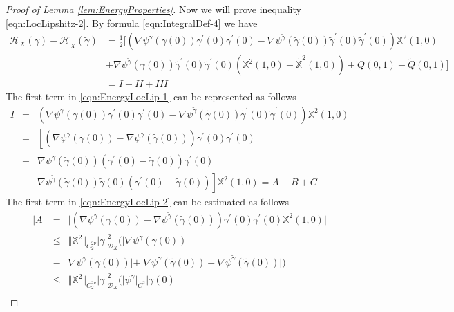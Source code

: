 \documentclass[11pt,a4paper,leqno]{amsart}%
\theoremstyle{plain}
\theoremstyle{remark}
\theoremstyle{plain}
\numberwithin{equation}{section}
\begin{document}
\begin{proof}[ Proof of Lemma \ref{lem:EnergyProperties}]
Now we will prove inequality \eqref{eqn:LocLipshitz-2}. By formula
\eqref{eqn:IntegralDef-4} we have
\begin{align}\label{eqn:EnergyLocLip-1}
\mathcal{H}_X(\gamma)-\mathcal{H}_{\tilde{X}}(\tilde{\gamma})&=\frac{1}{2}
\Big[(\nabla\psi^{\gamma}(\gamma(0))\gamma^\prime(0)\gamma^\prime(0)-\nabla\psi^{\tilde{\gamma}}(\tilde{\gamma}(0))\tilde{\gamma}^\prime(0)\tilde{\gamma}^\prime(0))
\mathbb{X}^2(1,0)\nonumber\\
&+\nabla\psi^{\tilde{\gamma}}(\tilde{\gamma}(0))\tilde{\gamma}^\prime(0)\tilde{\gamma}^\prime(0)(\mathbb{X}^2(1,0)-\mathbb{\tilde{X}}^2(1,0))
+Q(0,1)-\tilde{Q}(0,1)\Big]\!
\nonumber\\
 &=\!I\! +\! II\! +\! III
\end{align}
The first term in \eqref{eqn:EnergyLocLip-1} can be represented as
follows
\begin{eqnarray}
I &=&
(\nabla\psi^{\gamma}(\gamma(0))\gamma^\prime(0)\gamma^\prime(0)-\nabla\psi^{\tilde{\gamma}}(\tilde{\gamma}(0))\tilde{\gamma}^\prime(0)\tilde{\gamma}^\prime(0))
\mathbb{X}^2(1,0)\nonumber\\
 &=& \left[(\nabla\psi^{\gamma}(\gamma(0))-\nabla\psi^{\tilde{\gamma}}(\tilde{\gamma}(0)))\gamma^\prime(0)\gamma^\prime(0)\right.\nonumber\\
 &+& \nabla\psi^{\tilde{\gamma}}(\tilde{\gamma}(0))(\gamma^\prime(0)-\tilde{\gamma}(0))\gamma^\prime(0)\nonumber\\
 &+& \left.\nabla\psi^{\tilde{\gamma}}(\tilde{\gamma}(0))\tilde{\gamma}(0)(\gamma^\prime(0)-\tilde{\gamma}(0))\right]\mathbb{X}^2(1,0)=A+B+C\label{eqn:EnergyLocLip-2}
\end{eqnarray}
The first term in \eqref{eqn:EnergyLocLip-2} can be estimated as
follows
\begin{eqnarray}\label{eqn:EnergyLocLip-3}
\vert A\vert &=&\vert (\nabla\psi^{\gamma}(\gamma(0))-\nabla\psi^{\tilde{\gamma}}(\tilde{\gamma}(0)))\gamma^\prime(0)\gamma^\prime(0)\mathbb{X}^2(1,0)\vert \\
&\leq&
\Vert \mathbb{X}^2\Vert_{C_2^{2\nu}}\vert \gamma\vert_{\mathcal{D}_X}^2(\vert \nabla\psi^{\gamma}
(\gamma(0))\nonumber\\
&-&\nabla\psi^{\gamma}(\tilde{\gamma}(0))\vert +\vert \nabla\psi^{\gamma}(\tilde{\gamma}(0))-\nabla\psi^{\tilde{\gamma}}(\tilde{\gamma}(0))\vert )\nonumber\\
&\leq &\Vert \mathbb{X}^2\Vert_{C_2^{2\nu}}\vert \gamma\vert_{\mathcal{D}_X}^2(\vert \psi^{\gamma}\vert_{C^2}\vert \gamma(0)
\nonumber\\

\end{eqnarray}
\end{proof}
\end{document}
